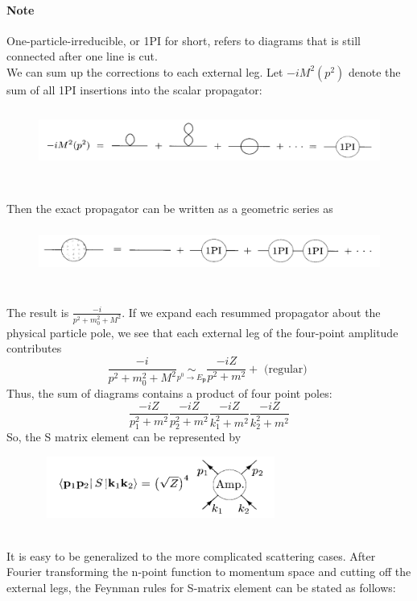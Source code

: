 \documentclass{article}
\begin{document}
\paragraph{Note} One-particle-irreducible, or 1PI for short, refers to diagrams that is still connected after one line is cut.\\ 
We can sum up the corrections to each external leg. Let $-iM^2(p^2)$ denote the sum of all 1PI insertions into the scalar propagator:
\begin{figure}[!h]
\centering
\includegraphics[height=2cm ,width=15cm]{./pic/LSZ2.png}
\caption*{}
\end{figure}\\
Then the exact propagator can be written as a geometric series as
\begin{figure}[!h]
\centering
\includegraphics[height=1.5cm ,width=15cm]{./pic/LSZ3.png}
\caption*{}
\end{figure}\\
The result is $\frac{-i}{p^2 + m_0^2 + M^2}$. If we expand each resummed propagator about the physical particle pole, we see that each external leg of the four-point amplitude contributes
\[\frac{-i}{p^2 + m_0^2 + M^2} \underset{p^0 \to E_{\mathbf{p}}}{\sim} \frac{-iZ}{p^2+m^2} + \mbox{ (regular) }\]
Thus, the sum of diagrams contains a product of four point poles:
\[\frac{-iZ}{p_1^2 + m^2} \frac{-iZ}{p_2^2 + m^2} \frac{-iZ}{k_1^2 + m^2} \frac{-iZ}{k_2^2 + m^2}\]
So, the S matrix element can be represented by 
\begin{figure}[!h]
\centering
\includegraphics[height=2cm ,width=8cm]{./pic/LSZ4.png}
\caption*{}
\end{figure}\\
It is easy to be generalized to the more complicated scattering cases. After Fourier transforming the n-point function to momentum space and cutting off the external legs, the Feynman rules for S-matrix element can be stated as follows:\\
\end{document}
